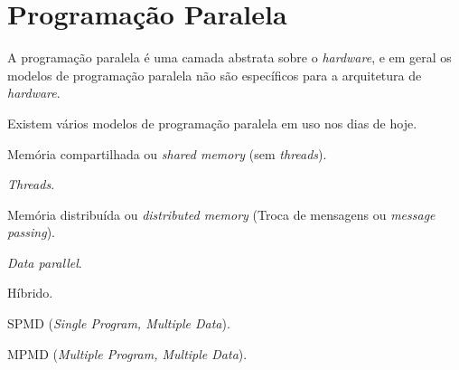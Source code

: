 
\chapter{Programação Paralela}

A programação paralela é uma camada abstrata sobre o \textit{hardware}, e em 
geral os modelos de programação paralela não são específicos para a arquitetura
de \textit{hardware}.

Existem vários modelos de programação paralela em uso nos dias de hoje.

\begin{alineas}
        \item Memória compartilhada ou \textit{shared memory} (sem
                        \textit{threads}).
        \item \textit{Threads}.
        \item Memória distribuída ou \textit{distributed memory} (Troca de
                        mensagens ou \textit{message passing}).
        \item \textit{Data parallel}.
        \item Híbrido.
        \item SPMD (\textit{Single Program, Multiple Data}).
        \item MPMD (\textit{Multiple Program, Multiple Data}).
\end{alineas}



